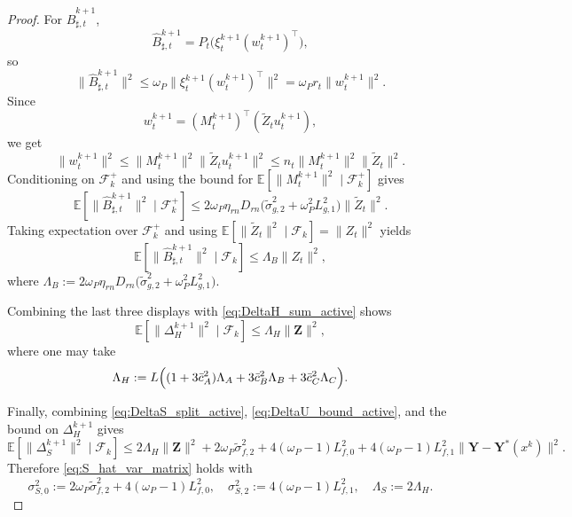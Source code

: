 \documentclass{pkumelon}
\theoremstyle{plain}
\newcommand{\E}{\mathbb{E}}
\begin{document}
\begin{proof}
For $\widehat B_{\sharp,t}^{k+1}$,
\begin{equation*}
\widehat B_{\sharp,t}^{k+1}=P_t\bigl(\xi_t^{k+1}(w_t^{k+1})^\top\bigr),
\end{equation*}
so
\begin{equation*}
\|\widehat B_{\sharp,t}^{k+1}\|^2 \le \omega_P\|\xi_t^{k+1}(w_t^{k+1})^\top\|^2 = \omega_P r_t\|w_t^{k+1}\|^2.
\end{equation*}
Since
\begin{equation*}
w_t^{k+1}=(M_t^{k+1})^\top(\tilde Z_t u_t^{k+1}),
\end{equation*}
we get
\begin{equation*}
\|w_t^{k+1}\|^2 \le \|M_t^{k+1}\|^2\|\tilde Z_t u_t^{k+1}\|^2 \le n_t\|M_t^{k+1}\|^2\|\tilde Z_t\|^2.
\end{equation*}
Conditioning on $\mathcal F_k^+$ and using the bound for $\E[\|M_t^{k+1}\|^2\mid \mathcal F_k^+]$ gives
\begin{equation*}
\E[\|\widehat B_{\sharp,t}^{k+1}\|^2\mid \mathcal F_k^+] \le 2\omega_P \eta_{rn} D_{rn}\bigl(\tilde\sigma_{g,2}^2+\omega_P^2L_{g,1}^2\bigr)\|\tilde Z_t\|^2.
\end{equation*}
Taking expectation over $\mathcal F_k^+$ and using $\E[\|\tilde Z_t\|^2\mid \mathcal F_k]=\|Z_t\|^2$ yields
\begin{equation*}
\E[\|\widehat B_{\sharp,t}^{k+1}\|^2\mid \mathcal F_k] \le \Lambda_B\|Z_t\|^2,
\end{equation*}
where $\Lambda_B:=2\omega_P \eta_{rn} D_{rn}\bigl(\tilde\sigma_{g,2}^2+\omega_P^2L_{g,1}^2\bigr)$.

Combining the last three displays with \eqref{eq:DeltaH_sum_active} shows
\begin{equation*}
\E[\|\Delta_H^{k+1}\|^2\mid \mathcal F_k] \le \Lambda_H\|\boldsymbol Z\|^2,
\end{equation*}
where one may take
\begin{equation}\label{eq:LambdaH_active}
\Lambda_H
:=
L\Bigl((1+3\bar c_A^2)\Lambda_A+3\bar c_B^2\Lambda_B+3\bar c_C^2\Lambda_C\Bigr).
\end{equation}

Finally, combining \eqref{eq:DeltaS_split_active}, \eqref{eq:DeltaU_bound_active}, and the bound on $\Delta_H^{k+1}$ gives
\begin{equation*}
\E[\|\Delta_S^{k+1}\|^2\mid \mathcal F_k] \le 2\Lambda_H\|\boldsymbol Z\|^2 +2\omega_P\tilde\sigma_{f,2}^2 +4(\omega_P-1)L_{f,0}^2 +4(\omega_P-1)L_{f,1}^2\|\boldsymbol Y-\boldsymbol Y^*(x^k)\|^2.
\end{equation*}
Therefore \eqref{eq:S_hat_var_matrix} holds with
\begin{equation*}
\sigma_{S,0}^2:=2\omega_P\tilde\sigma_{f,2}^2+4(\omega_P-1)L_{f,0}^2, \quad \sigma_{S,2}^2:=4(\omega_P-1)L_{f,1}^2, \quad \Lambda_S:=2\Lambda_H.
\end{equation*}
\end{proof}
\end{document}

